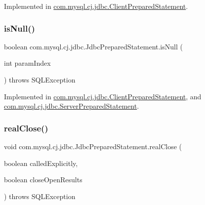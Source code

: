 Implemented in \mbox{\hyperlink{classcom_1_1mysql_1_1cj_1_1jdbc_1_1_client_prepared_statement_aa7710948c9da0ab8fc0591a3b7054c4d}{com.\+mysql.\+cj.\+jdbc.\+Client\+Prepared\+Statement}}.

\mbox{\label{interfacecom_1_1mysql_1_1cj_1_1jdbc_1_1_jdbc_prepared_statement_afdd7b92fa3a45b8643a7f992807b487a}} 
\subsubsection{\texorpdfstring{is\+Null()}{isNull()}}
{\footnotesize\ttfamily boolean com.\+mysql.\+cj.\+jdbc.\+Jdbc\+Prepared\+Statement.\+is\+Null (\begin{DoxyParamCaption}\item[{int}]{param\+Index }\end{DoxyParamCaption}) throws S\+Q\+L\+Exception}



Implemented in \mbox{\hyperlink{classcom_1_1mysql_1_1cj_1_1jdbc_1_1_client_prepared_statement_aa3bd6acd74d7817920960edc3a656232}{com.\+mysql.\+cj.\+jdbc.\+Client\+Prepared\+Statement}}, and \mbox{\hyperlink{classcom_1_1mysql_1_1cj_1_1jdbc_1_1_server_prepared_statement_a15d2854a9fb7f6c31acc873ca4d5ead8}{com.\+mysql.\+cj.\+jdbc.\+Server\+Prepared\+Statement}}.

\mbox{\label{interfacecom_1_1mysql_1_1cj_1_1jdbc_1_1_jdbc_prepared_statement_a141eeee85d7c5f0b1a3cb6efbe2b052a}} 
\subsubsection{\texorpdfstring{real\+Close()}{realClose()}}
{\footnotesize\ttfamily void com.\+mysql.\+cj.\+jdbc.\+Jdbc\+Prepared\+Statement.\+real\+Close (\begin{DoxyParamCaption}\item[{boolean}]{called\+Explicitly,  }\item[{boolean}]{close\+Open\+Results }\end{DoxyParamCaption}) throws S\+Q\+L\+Exception}



